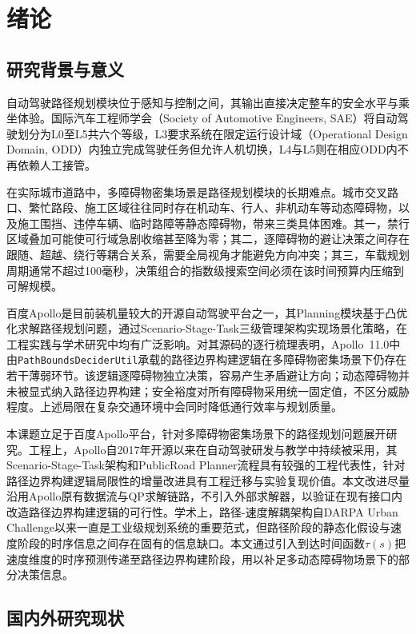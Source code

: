 \chapter{绪论}
\label{chap:intro}

\section{研究背景与意义}

自动驾驶路径规划模块位于感知与控制之间，其输出直接决定整车的安全水平与乘坐体验。国际汽车工程师学会（Society of Automotive Engineers, SAE）将自动驾驶划分为L0至L5共六个等级\cite{paden2016}，L3要求系统在限定运行设计域（Operational Design Domain, ODD）内独立完成驾驶任务但允许人机切换，L4与L5则在相应ODD内不再依赖人工接管。

在实际城市道路中，多障碍物密集场景是路径规划模块的长期难点\cite{gonzalez2016}。城市交叉路口、繁忙路段、施工区域往往同时存在机动车、行人、非机动车等动态障碍物，以及施工围挡、违停车辆、临时路障等静态障碍物，带来三类具体困难。其一，禁行区域叠加可能使可行域急剧收缩甚至降为零；其二，逐障碍物的避让决策之间存在跟随、超越、绕行等耦合关系，需要全局视角才能避免方向冲突；其三，车载规划周期通常不超过100毫秒\cite{fan2018baidu}，决策组合的指数级搜索空间必须在该时间预算内压缩到可解规模。

百度Apollo是目前装机量较大的开源自动驾驶平台之一\cite{apollo2024}，其Planning模块基于凸优化求解路径规划问题，通过Scenario-Stage-Task三级管理架构实现场景化策略，在工程实践与学术研究中均有广泛影响。对其源码的逐行梳理表明，Apollo~11.0中由\texttt{PathBoundsDeciderUtil}承载的路径边界构建逻辑在多障碍物密集场景下仍存在若干薄弱环节。该逻辑逐障碍物独立决策，容易产生矛盾避让方向；动态障碍物并未被显式纳入路径边界构建；安全裕度对所有障碍物采用统一固定值，不区分威胁程度。上述局限在复杂交通环境中会同时降低通行效率与规划质量。

本课题立足于百度Apollo平台，针对多障碍物密集场景下的路径规划问题展开研究。工程上，Apollo自2017年开源以来在自动驾驶研发与教学中持续被采用，其Scenario-Stage-Task架构和PublicRoad Planner流程具有较强的工程代表性，针对路径边界构建逻辑局限性的增量改进具有工程迁移与实验复现价值。本文改进尽量沿用Apollo原有数据流与QP求解链路，不引入外部求解器，以验证在现有接口内改造路径边界构建逻辑的可行性。学术上，路径-速度解耦架构自DARPA Urban Challenge以来一直是工业级规划系统的重要范式，但路径阶段的静态化假设与速度阶段的时序信息之间存在固有的信息缺口。本文通过引入到达时间函数$\tau(s)$把速度维度的时序预测传递至路径边界构建阶段，用以补足多动态障碍物场景下的部分决策信息。

\section{国内外研究现状}


